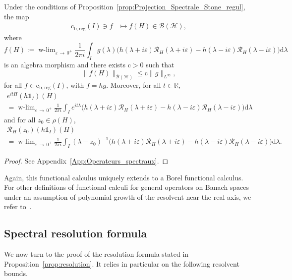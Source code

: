 \documentclass[10pt]{amsart}
\theoremstyle{definition}\newtheorem{defi}[theo]{Definition}\newtheorem{rema}[theo]{Remark}\newtheorem{exam}[theo]{Example}\newtheorem{exem}[theo]{Example}\newtheorem{nota}[theo]{Notation}
\newcommand{\Hi}{\mathcal{H}}
\newcommand{\R}{\mathbb{R}}
\newcommand{\rmc}{\mathrm{c}}
\newcommand{\rmd}{\mathrm{d}}
\newcommand{\rmb}{\mathrm{b}}
\newcommand{\reg}{\mathrm{reg}}
\newcommand{\Res}{\mathcal{R}}
\newcommand{\clB}{\mathcal{B}}
\DeclareMathOperator{\wlim}{w-lim}
\begin{document}
\begin{prop}\label{prop:functional_calculus_reg}
Under the conditions of Proposition~\ref{prop:Projection_Spectrale_Stone_regul}, the map
\begin{align*}
\rmc_{\rmb,\reg}(I)\ni f&\mapsto f(H)\in\clB(\Hi),
\end{align*}
where
\begin{equation*}
f(H):=\wlim_{\varepsilon\,\rightarrow\,0^+}\frac{1}{2\pi i}\int_Ig(\lambda)\big(h(\lambda+i\varepsilon)\Res_{H}(\lambda+i\varepsilon)-h(\lambda-i\varepsilon)\Res_{H}(\lambda-i\varepsilon)\big)\rmd \lambda
\end{equation*}
is an algebra morphism and there exists $\rmc>0$ such that
\begin{equation}\label{eq:algebra_morph_regul}
\|f(H)\|_{\clB(\Hi)} \le \rmc \|g\|_{L^\infty},
\end{equation}
for all $f \in \rmc_{\rmb,\reg}(I)$, with $f=hg$. Moreover, for all $t\in\R$,
\begin{multline}\label{eq:Projection_spectral_calcul_fonctionnel_semi-group_regul}
e^{itH}(h\mathds{1}_I)(H)\\
=\wlim_{\varepsilon\,\rightarrow\,0^+}\frac{1}{2\pi i}\int_I e^{it\lambda}\big(h(\lambda+i\varepsilon)\Res_H(\lambda+i\varepsilon)-h(\lambda-i\varepsilon)\Res_H(\lambda-i\varepsilon)\big)\rmd \lambda
\end{multline}
and for all $z_0\in\rho(H)$,
\begin{multline}\label{eq:Projection_spectral_calcul_fonctionnel_resolvent_regul}
\Res_H(z_0)(h\mathds{1}_I)(H)\\
=\wlim_{\varepsilon\,\rightarrow\,0^+}\frac{1}{2\pi i}\int_I (\lambda-z_0)^{-1} \big(h(\lambda+i\varepsilon)\Res_H(\lambda+i\varepsilon)-h(\lambda-i\varepsilon)\Res_H(\lambda-i\varepsilon)\big)\rmd \lambda.
\end{multline}
\end{prop}


\begin{proof}
See Appendix~\ref{App:Operateurs_spectraux}.
\end{proof}

Again, this functional calculus uniquely extends to a Borel functional calculus. For other definitions of functional calculi for general operators on Banach spaces under an assumption of polynomial growth of the resolvent near the real axis, we refer to~\cite{Da95_01,GeGeHa13_01}.

\subsection{Spectral resolution formula}\label{subsec:spectr_res}
We now turn to the proof of the resolution formula stated in Proposition~\ref{prop:resolution}. It relies in particular on the following resolvent bounds.
\end{document}
